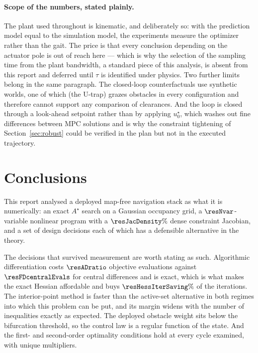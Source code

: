 \documentclass[11pt,a4paper]{article}
\newcommand{\astar}{$A^\star$}
\begin{document}
\paragraph{Scope of the numbers, stated plainly.} The plant used throughout is kinematic, and deliberately
so: with the prediction model equal to the simulation model, the experiments measure the optimizer rather
than the gait. The price is that every conclusion depending on the actuator pole is out of reach here ---
which is why the selection of the sampling time from the plant bandwidth, a standard piece of this analysis,
is absent from this report and deferred until $\tau$ is identified under physics. Two further limits belong
in the same paragraph. The closed-loop counterfactuals use synthetic worlds, one of which (the U-trap) grazes
obstacles in every configuration and therefore cannot support any comparison of clearances. And the loop is
closed through a look-ahead setpoint rather than by applying $u^\star_0$, which washes out fine differences
between MPC solutions and is why the constraint tightening of Section~\ref{sec:robust} could be verified in
the plan but not in the executed trajectory.

\section{Conclusions}
\label{sec:conclusions}

This report analysed a deployed map-free navigation stack as what it is numerically: an exact \astar{} search
on a Gaussian occupancy grid, a $\resNvar$-variable nonlinear program with a $\resJacDensity\%$ dense
constraint Jacobian, and a set of design decisions each of which has a defensible alternative in the theory.

The decisions that survived measurement are worth stating as such. Algorithmic differentiation costs
$\resADratio$ objective evaluations against $\resFDcentralEvals$ for central differences and is exact, which
is what makes the exact Hessian affordable and buys $\resHessIterSaving\%$ of the iterations. The
interior-point method is faster than the active-set alternative in both regimes into which this problem can
be put, and its margin widens with the number of inequalities exactly as expected. The deployed obstacle
weight sits below the bifurcation threshold, so the control law is a regular function of the state. And the
first- and second-order optimality conditions hold at every cycle examined, with unique multipliers.
\end{document}
